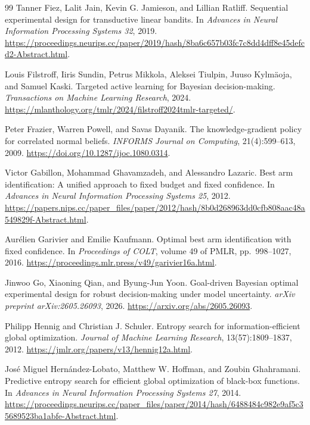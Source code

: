 \documentclass{article}
\theoremstyle{plain}
\theoremstyle{definition}
\begin{document}
\begin{thebibliography}{99}
Tanner Fiez, Lalit Jain, Kevin G. Jamieson, and Lillian Ratliff.
Sequential experimental design for transductive linear bandits.
In \emph{Advances in Neural Information Processing Systems 32}, 2019.
\url{https://proceedings.neurips.cc/paper/2019/hash/8ba6c657b03fc7c8dd4dff8e45defcd2-Abstract.html}.

Louis Filstroff, Iiris Sundin, Petrus Mikkola, Aleksei Tiulpin, Juuso Kylm\"aoja, and Samuel Kaski.
Targeted active learning for Bayesian decision-making.
\emph{Transactions on Machine Learning Research}, 2024.
\url{https://mlanthology.org/tmlr/2024/filstroff2024tmlr-targeted/}.

Peter Frazier, Warren Powell, and Savas Dayanik.
The knowledge-gradient policy for correlated normal beliefs.
\emph{INFORMS Journal on Computing}, 21(4):599--613, 2009.
\url{https://doi.org/10.1287/ijoc.1080.0314}.

Victor Gabillon, Mohammad Ghavamzadeh, and Alessandro Lazaric.
Best arm identification: A unified approach to fixed budget and fixed confidence.
In \emph{Advances in Neural Information Processing Systems 25}, 2012.
\url{https://papers.nips.cc/paper_files/paper/2012/hash/8b0d268963dd0cfb808aac48a549829f-Abstract.html}.

Aur\'elien Garivier and Emilie Kaufmann.
Optimal best arm identification with fixed confidence.
In \emph{Proceedings of COLT}, volume 49 of PMLR, pp.\ 998--1027, 2016.
\url{https://proceedings.mlr.press/v49/garivier16a.html}.

Jinwoo Go, Xiaoning Qian, and Byung-Jun Yoon.
Goal-driven Bayesian optimal experimental design for robust decision-making under model uncertainty.
\emph{arXiv preprint arXiv:2605.26093}, 2026.
\url{https://arxiv.org/abs/2605.26093}.

Philipp Hennig and Christian J. Schuler.
Entropy search for information-efficient global optimization.
\emph{Journal of Machine Learning Research}, 13(57):1809--1837, 2012.
\url{https://jmlr.org/papers/v13/hennig12a.html}.

Jos\'e Miguel Hern\'andez-Lobato, Matthew W. Hoffman, and Zoubin Ghahramani.
Predictive entropy search for efficient global optimization of black-box functions.
In \emph{Advances in Neural Information Processing Systems 27}, 2014.
\url{https://proceedings.neurips.cc/paper_files/paper/2014/hash/6488484c982e9af5c35689523ba1abfe-Abstract.html}.


\end{thebibliography}
\end{document}
